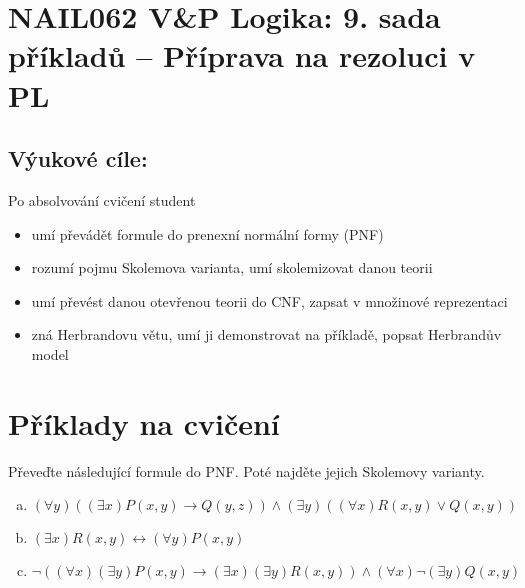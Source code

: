 \section*{NAIL062 V\&P Logika: 9. sada příkladů -- Příprava na rezoluci v PL}


\subsection*{Výukové cíle:} Po absolvování cvičení student

    \begin{itemize}\setlength{\itemsep}{0pt}
        \item umí převádět formule do prenexní normální formy (PNF)
        \item rozumí pojmu Skolemova varianta, umí skolemizovat danou teorii
        \item umí převést danou otevřenou teorii do CNF, zapsat v množinové reprezentaci
        \item zná Herbrandovu větu, umí ji demonstrovat na příkladě, popsat Herbrandův model
    \end{itemize}
    

\section*{Příklady na cvičení}


\begin{problem} 
    
    Převeďte následující formule do PNF. Poté najděte jejich Skolemovy varianty.
    \begin{enumerate}[(a)]
        \item $(\forall y)((\exists x)P(x,y)\to Q(y,z))\wedge (\exists y)((\forall x)R(x,y)\vee Q(x,y))$
        \item $(\exists x)R(x,y)\leftrightarrow (\forall y)P(x,y)$
        \item $\neg((\forall x)(\exists y)P(x,y)\to (\exists x)(\exists y)R(x,y))\wedge(\forall x)\neg(\exists y)Q(x,y)$
    \end{enumerate}

    \begin{solution}
                    
    \end{solution}

\end{problem}


